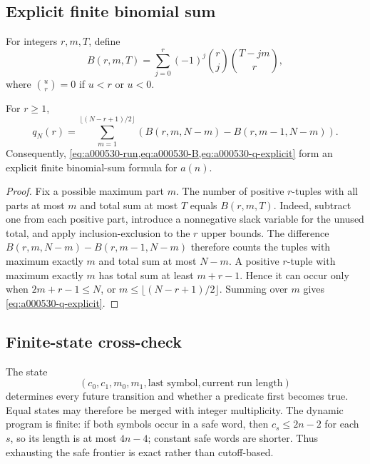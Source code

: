 \subsection{Explicit finite binomial sum}

For integers \(r,m,T\), define
\begin{equation}
 B(r,m,T)=\sum_{j=0}^{r}(-1)^j\binom{r}{j}
                         \binom{T-jm}{r},
 \label{eq:a000530-B}
\end{equation}
where \(\binom{u}{r}=0\) if \(u<r\) or \(u<0\).

\begin{proposition}
\label{prop:a000530-q-explicit}
For \(r\ge1\),
\begin{equation}
 q_N(r)=
 \sum_{m=1}^{\lfloor(N-r+1)/2\rfloor}
 \left(B(r,m,N-m)-B(r,m-1,N-m)\right).
 \label{eq:a000530-q-explicit}
\end{equation}
Consequently, \cref{eq:a000530-run,eq:a000530-B,eq:a000530-q-explicit}
form an explicit finite binomial-sum formula for \(a(n)\).
\end{proposition}

\begin{proof}
Fix a possible maximum part \(m\).  The number of positive \(r\)-tuples with
all parts at most \(m\) and total sum at most \(T\) equals \(B(r,m,T)\).
Indeed, subtract one from each positive part, introduce a nonnegative slack
variable for the unused total, and apply inclusion-exclusion to the \(r\)
upper bounds.  The difference
\(B(r,m,N-m)-B(r,m-1,N-m)\) therefore counts the tuples with maximum exactly
\(m\) and total sum at most \(N-m\).  A positive \(r\)-tuple with maximum exactly \(m\) has total sum at least \(m+r-1\).  Hence it can occur only when \(2m+r-1\le N\), or \(m\le\lfloor(N-r+1)/2\rfloor\).  Summing over \(m\) gives \cref{eq:a000530-q-explicit}.
\end{proof}

\subsection{Finite-state cross-check}

The state
\[
 (c_0,c_1,m_0,m_1,\text{last symbol},\text{current run length})
\]
determines every future transition and whether a predicate first becomes true.
Equal states may therefore be merged with integer multiplicity.  The dynamic
program is finite: if both symbols occur in a safe word, then
\(c_s\le2n-2\) for each \(s\), so its length is at most \(4n-4\); constant
safe words are shorter.  Thus exhausting the safe frontier is exact rather
than cutoff-based.

